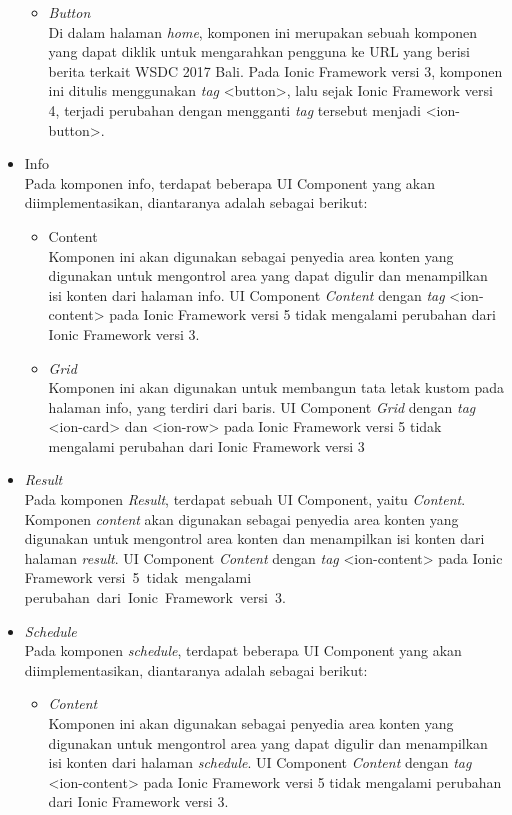 \begin{itemize}
\begin{itemize}
			\item \textit{Button} \\
			Di dalam halaman \textit{home}, komponen ini merupakan sebuah komponen yang dapat diklik untuk mengarahkan pengguna ke URL yang berisi berita terkait WSDC 2017 Bali. Pada Ionic Framework versi 3, komponen ini ditulis menggunakan \textit{tag} <button>, lalu sejak Ionic Framework versi 4, terjadi perubahan dengan mengganti \textit{tag} tersebut menjadi <ion-button>.
			
		\end{itemize}
		
	\item Info \\
	Pada komponen info, terdapat beberapa UI Component yang akan diimplementasikan, diantaranya adalah sebagai berikut:
		\begin{itemize}
			\item Content \\
		Komponen ini akan digunakan sebagai penyedia area konten yang digunakan untuk mengontrol area yang dapat digulir dan menampilkan isi konten dari halaman info. UI Component \textit{Content} dengan \textit{tag} <ion-content> pada Ionic Framework versi 5 tidak mengalami perubahan dari Ionic Framework versi 3.
		
			\item \textit{Grid} \\
		Komponen ini akan digunakan untuk membangun tata letak kustom pada halaman info, yang terdiri dari baris. UI Component \textit{Grid} dengan \textit{tag} <ion-card> dan <ion-row> pada Ionic Framework versi 5 tidak mengalami perubahan dari Ionic Framework versi 3
		\end{itemize}
		
	\item \textit{Result} \\ 
	Pada komponen \textit{Result}, terdapat sebuah UI Component, yaitu \textit{Content}. Komponen \textit{content} akan digunakan sebagai penyedia area konten yang digunakan untuk mengontrol area konten dan menampilkan isi konten dari halaman \textit{result}. UI Component \textit{Content} dengan \textit{tag} <ion-content> pada Ionic Framework versi~5~tidak~mengalami perubahan~dari~Ionic~Framework~versi~3. 

\newpage		
		
	\item \textit{Schedule} \\
	Pada komponen \textit{schedule}, terdapat beberapa UI Component yang akan diimplementasikan, diantaranya adalah sebagai berikut:
		\begin{itemize}
			\item \textit{Content} \\
		Komponen ini akan digunakan sebagai penyedia area konten yang digunakan untuk mengontrol area yang dapat digulir dan menampilkan isi konten dari halaman \textit{schedule}. UI Component \textit{Content} dengan \textit{tag} <ion-content> pada Ionic Framework versi 5 tidak mengalami perubahan dari Ionic Framework versi 3.
		

\end{itemize}
\end{itemize}
